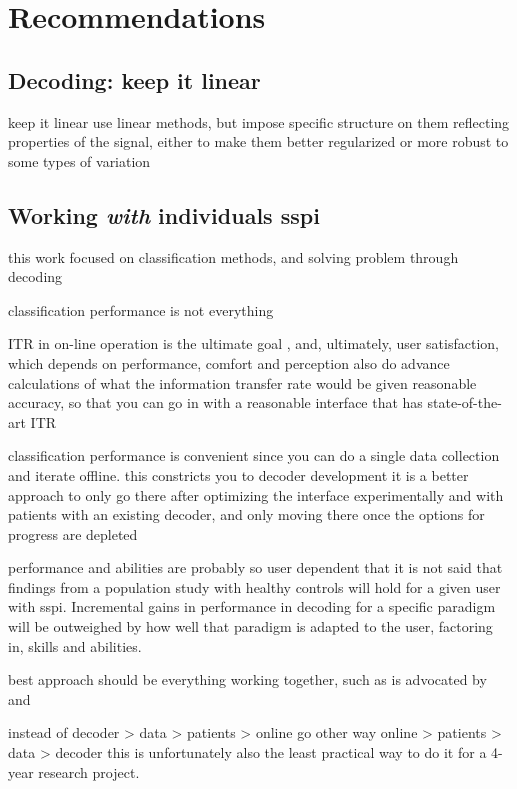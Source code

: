 \section{Recommendations}

\subsection{Decoding: keep it linear}

keep it linear
use linear methods, but impose specific structure on them reflecting properties
of the signal, either to make them better regularized or more robust to some
types of variation

\subsection{Working \emph{with} individuals \acs{sspi}}

this work focused on classification methods, and solving problem through
decoding

classification performance is not everything

ITR in on-line operation is the ultimate goal
, and, ultimately, user satisfaction, which depends on performance, comfort and perception
also do advance calculations of what the information transfer rate would be
given reasonable accuracy, so that you can go in with a reasonable interface
that has state-of-the-art ITR

classification performance is convenient since you can do a single data
collection and iterate offline.
this constricts you to decoder development
it is a better approach to only go there after optimizing the interface
experimentally and with patients with an existing
decoder, and only moving there once the options for progress are depleted

performance and abilities are probably so user dependent that it is not said that
findings from a population study with healthy controls will hold for a given
user with \ac{sspi}.
Incremental gains in performance in decoding for a specific paradigm will be
outweighed by how well that paradigm is adapted to the user, factoring in,
skills and abilities.

best approach should be everything working together, such as is advocated
by~\textcite{Pan2022} and \textcite{Fouad2020}

instead of decoder > data > patients > online
go other way
online > patients > data > decoder
this is unfortunately also the least practical way to do it for a 4-year
research project.

